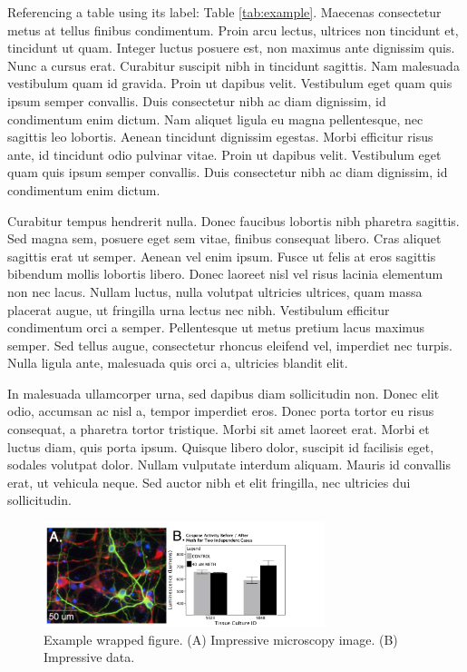 \documentclass[11pt, notitlepage]{article} %
\begin{document}
Referencing a table using its label: Table \ref{tab:example}. Maecenas consectetur metus at tellus finibus condimentum. Proin arcu lectus, ultrices non tincidunt et, tincidunt ut quam. Integer luctus posuere est, non maximus ante dignissim quis. Nunc a cursus erat. Curabitur suscipit nibh in tincidunt sagittis. Nam malesuada vestibulum quam id gravida. Proin ut dapibus velit. Vestibulum eget quam quis ipsum semper convallis. Duis consectetur nibh ac diam dignissim, id condimentum enim dictum. Nam aliquet ligula eu magna pellentesque, nec sagittis leo lobortis. Aenean tincidunt dignissim egestas. Morbi efficitur risus ante, id tincidunt odio pulvinar vitae. Proin ut dapibus velit. Vestibulum eget quam quis ipsum semper convallis. Duis consectetur nibh ac diam dignissim, id condimentum enim dictum.

Curabitur tempus hendrerit nulla. Donec faucibus lobortis nibh pharetra sagittis. Sed magna sem, posuere eget sem vitae, finibus consequat libero. Cras aliquet sagittis erat ut semper. Aenean vel enim ipsum. Fusce ut felis at eros sagittis bibendum mollis lobortis libero. Donec laoreet nisl vel risus lacinia elementum non nec lacus. Nullam luctus, nulla volutpat ultricies ultrices, quam massa placerat augue, ut fringilla urna lectus nec nibh. Vestibulum efficitur condimentum orci a semper. Pellentesque ut metus pretium lacus maximus semper. Sed tellus augue, consectetur rhoncus eleifend vel, imperdiet nec turpis. Nulla ligula ante, malesuada quis orci a, ultricies blandit elit.

In malesuada ullamcorper urna, sed dapibus diam sollicitudin non. Donec elit odio, accumsan ac nisl a, tempor imperdiet eros. Donec porta tortor eu risus consequat, a pharetra tortor tristique. Morbi sit amet laoreet erat. Morbi et luctus diam, quis porta ipsum. Quisque libero dolor, suscipit id facilisis eget, sodales volutpat dolor. Nullam vulputate interdum aliquam. Mauris id convallis erat, ut vehicula neque. Sed auctor nibh et elit fringilla, nec ultricies dui sollicitudin.

\begin{figure} %
	\includegraphics[width=8.2cm]{Figures/Fig1.jpg}
	\caption{\footnotesize Example wrapped figure. (A) Impressive microscopy image. (B) Impressive data.}
	\label{fig:example}
\end{figure}
\end{document}
